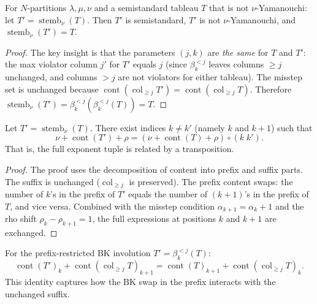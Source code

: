 \begin{theorem}
\label{lem.sf.stemb-involutive}
\leanhelper
\leanok
For $N$-partitions $\lambda, \mu, \nu$ and a semistandard tableau $T$ that
is not $\nu$-Yamanouchi: let $T' = \operatorname{stemb}_\nu(T)$. Then
$T'$ is semistandard, $T'$ is not $\nu$-Yamanouchi, and
$\operatorname{stemb}_\nu(T') = T$.
\end{theorem}

\begin{proof}
\leanok
The key insight is that the parameters $(j, k)$ are \emph{the same} for $T$
and $T'$: the max violator column $j'$ for $T'$ equals $j$ (since $\beta_k^{<j}$
leaves columns $\geq j$ unchanged, and columns $> j$ are not violators for either
tableau). The misstep set is unchanged because
$\operatorname{cont}(\operatorname{col}_{\geq j} T')
= \operatorname{cont}(\operatorname{col}_{\geq j} T)$.
Therefore $\operatorname{stemb}_\nu(T') = \beta_k^{<j}(\beta_k^{<j}(T)) = T$.
\end{proof}

\begin{lemma}
\label{lem.sf.stemb-content-transposition}
\leanhelper
\leanok
Let $T' = \operatorname{stemb}_\nu(T)$. There exist indices $k \neq k'$
(namely $k$ and $k{+}1$) such that
\[
  \nu + \operatorname{cont}(T') + \rho
  = (\nu + \operatorname{cont}(T) + \rho) \circ (k\;k').
\]
That is, the full exponent tuple is related by a transposition.
\end{lemma}

\begin{proof}
\leanok
The proof uses the decomposition of content into prefix and suffix parts.
The suffix is unchanged ($\operatorname{col}_{\geq j}$ is preserved).
The prefix content swaps: the number of $k$'s in the prefix of $T'$ equals
the number of $(k{+}1)$'s in the prefix of $T$, and vice versa. Combined with
the misstep condition $\alpha_{k+1} = \alpha_k + 1$ and the rho shift
$\rho_k - \rho_{k+1} = 1$, the full expressions at positions $k$ and $k{+}1$
are exchanged.
\end{proof}

\begin{lemma}
\label{lem.sf.bk-prefix-content-swap}
\leanhelper
\leanok
For the prefix-restricted BK involution $T' = \beta_k^{<j}(T)$:
\[
  \operatorname{cont}(T')_k + \operatorname{cont}(\operatorname{col}_{\geq j} T)_{k+1}
  = \operatorname{cont}(T)_{k+1} + \operatorname{cont}(\operatorname{col}_{\geq j} T)_k.
\]
This identity captures how the BK swap in the prefix interacts with the
unchanged suffix.
\end{lemma}

